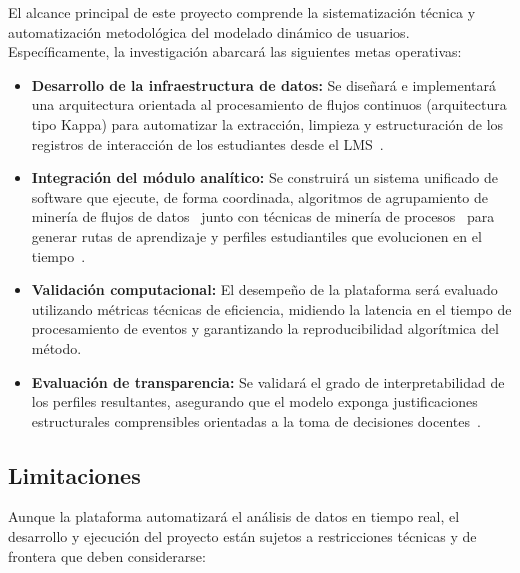 El alcance principal de este proyecto comprende la sistematización técnica y automatización metodológica del modelado dinámico de usuarios. Específicamente, la investigación abarcará las siguientes metas operativas:

\begin{itemize}
    \item \textbf{Desarrollo de la infraestructura de datos:} Se diseñará e implementará una arquitectura orientada al procesamiento de flujos continuos (arquitectura tipo Kappa) para automatizar la extracción, limpieza y estructuración de los registros de interacción de los estudiantes desde el LMS~\cite{Kundavaram2025}.
    \item \textbf{Integración del módulo analítico:} Se construirá un sistema unificado de software que ejecute, de forma coordinada, algoritmos de agrupamiento de minería de flujos de datos~\cite{Batool2021} junto con técnicas de minería de procesos~\cite{AlQaheri2022,Supriyanto2025} para generar rutas de aprendizaje y perfiles estudiantiles que evolucionen en el tiempo~\cite{YeseniaZavaleta-Sanchez2025}.
    \item \textbf{Validación computacional:} El desempeño de la plataforma será evaluado utilizando métricas técnicas de eficiencia, midiendo la latencia en el tiempo de procesamiento de eventos y garantizando la reproducibilidad algorítmica del método.
    \item \textbf{Evaluación de transparencia:} Se validará el grado de interpretabilidad de los perfiles resultantes, asegurando que el modelo exponga justificaciones estructurales comprensibles orientadas a la toma de decisiones docentes~\cite{BarredoArrieta2020,Lee2025}.
\end{itemize}

\subsection{Limitaciones}

Aunque la plataforma automatizará el análisis de datos en tiempo real, el desarrollo y ejecución del proyecto están sujetos a restricciones técnicas y de frontera que deben considerarse:

